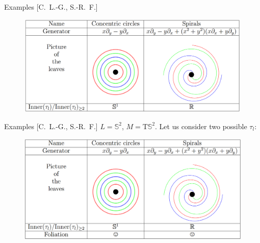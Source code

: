 \documentclass[
aspectratio=3218, 
10pt
]{beamer}
\theoremstyle{plain}
\theoremstyle{remark}
\begin{document}
{\begin{frame}{Examples {[C.\ L.-G., S.-R.\ F.]}}
\begin{figure}[htbp]
	\centering
		\includegraphics[width=1.00\textwidth]{Circles and Spirals.png}
	\label{fig:Circles and Spirals}
\end{figure}
\end{frame}

\begin{frame}{Examples {[C.\ L.-G., S.-R.\ F.]}}
$L = \mathbb{S}^2$, $M = \mathrm{T}\mathbb{S}^2$. Let us consider two possible $\tau_l$:

\begin{figure}[htbp]
	\centering
		\includegraphics[width=1.00\textwidth]{Circles and Spirals with princ.png}
	\label{fig:Circles and Spirals with princ}
\end{figure}
\end{frame}

}
\end{document}
